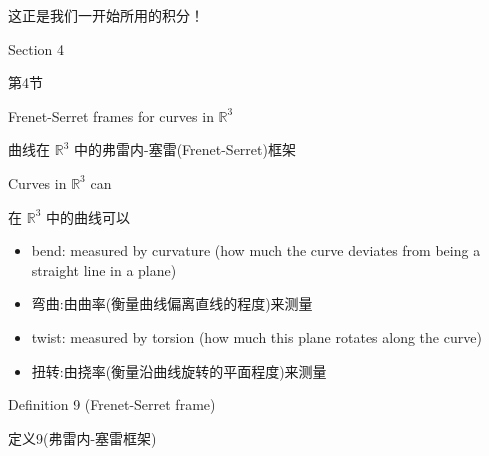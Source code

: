 \begin{tcolorbox}
这正是我们一开始所用的积分！
\end{tcolorbox}

Section 4

\begin{tcolorbox}
第4节
\end{tcolorbox}

Frenet-Serret frames for curves in \({\mathbb{R}}^{3}\)

\begin{tcolorbox}
曲线在 \({\mathbb{R}}^{3}\) 中的弗雷内-塞雷(Frenet-Serret)框架
\end{tcolorbox}

Curves in \({\mathbb{R}}^{3}\) can

\begin{tcolorbox}
在 \({\mathbb{R}}^{3}\) 中的曲线可以
\end{tcolorbox}

\begin{itemize}
\item bend: measured by curvature (how much the curve deviates from being a straight line in a plane)
\end{itemize}

\begin{tcolorbox}
\begin{itemize}
\item 弯曲:由曲率(衡量曲线偏离直线的程度)来测量
\end{itemize}
\end{tcolorbox}

\begin{itemize}
\item twist: measured by torsion (how much this plane rotates along the curve)
\end{itemize}

\begin{tcolorbox}
\begin{itemize}
\item 扭转:由挠率(衡量沿曲线旋转的平面程度)来测量
\end{itemize}
\end{tcolorbox}

\HRule

Definition 9 (Frenet-Serret frame)

\begin{tcolorbox}
定义9(弗雷内-塞雷框架)
\end{tcolorbox}

\HRule

